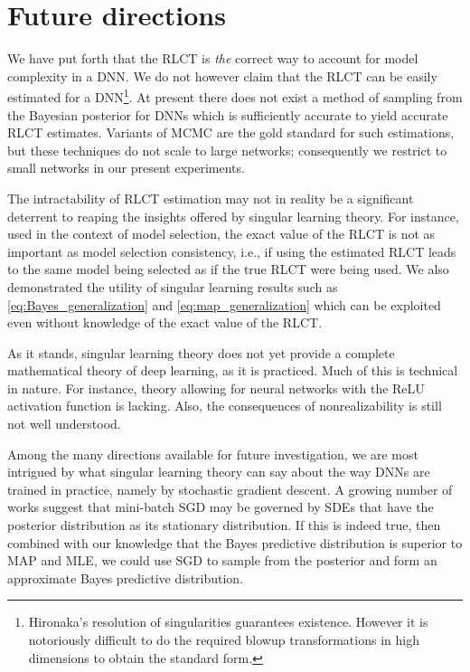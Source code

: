 \documentclass{article} %
\begin{document}
\section{Future directions}
We have put forth that the RLCT is \textit{the} correct way to account for model complexity in a DNN. We do not however claim that the RLCT can be easily estimated for a DNN\footnote{Hironaka's resolution of singularities guarantees existence. However it is notoriously difficult to do the required blowup transformations in high dimensions to obtain the standard form.}. 
At present there does not exist a method of sampling from the Bayesian posterior for DNNs which is sufficiently accurate to yield accurate RLCT estimates. Variants of MCMC are the gold standard for such estimations, but these techniques do not scale to large networks; consequently we restrict to small networks in our present experiments.

The intractability of RLCT estimation may not in reality be a significant deterrent to reaping the insights offered by singular learning theory. For instance, used in the context of model selection, the exact value of the RLCT is not as important as model selection consistency, i.e., if using the estimated RLCT leads to the same model being selected as if the true RLCT were being used. We also demonstrated the utility of singular learning results such as \eqref{eq:Bayes_generalization} and \eqref{eq:map_generalization} which can be exploited even without knowledge of the exact value of the RLCT.

As it stands, singular learning theory does not yet provide a complete mathematical theory of deep learning, as it is practiced. Much of this is technical in nature. For instance, theory allowing for neural networks with the ReLU activation function is lacking. Also, the consequences of nonrealizability is still not well understood. 

Among the many directions available for future investigation, we are most intrigued by what singular learning theory can say about the way DNNs are trained in practice, namely by stochastic gradient descent. A growing number of works \citep{??} suggest that mini-batch SGD may be governed by SDEs that have the posterior distribution as its stationary distribution. If this is indeed true, then combined with our knowledge that the Bayes predictive distribution is superior to MAP and MLE, we could use SGD to sample from the posterior and form an approximate Bayes predictive distribution. 
\end{document}

